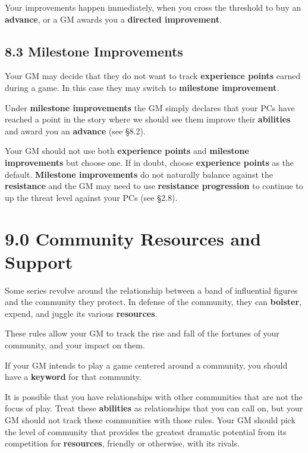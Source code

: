 \documentclass[
  11pt,
]{article}
\begin{document}
Your improvements happen immediately, when you cross the threshold to
buy an \textbf{advance}, or a GM awards you a \textbf{directed
improvement}.

\hypertarget{milestone-improvements}{%
\subsection{8.3 Milestone Improvements}\label{milestone-improvements}}

Your GM may decide that they do not want to track \textbf{experience
points} earned during a game. In this case they may switch to
\textbf{milestone improvement}.

Under \textbf{milestone improvements} the GM simply declares that your
PCs have reached a point in the story where we should see them improve
their \textbf{abilities} and award you an \textbf{advance} (see §8.2).

Your GM should not use both \textbf{experience points} and
\textbf{milestone improvements} but choose one. If in doubt, choose
\textbf{experience points} as the default. \textbf{Milestone
improvements} do not naturally balance against the \textbf{resistance}
and the GM may need to use \textbf{resistance progression} to continue
to up the threat level against your PCs (see §2.8).

\hypertarget{community-resources-and-support}{%
\section{9.0 Community Resources and
Support}\label{community-resources-and-support}}

Some series revolve around the relationship between a band of
influential figures and the community they protect. In defense of the
community, they can \textbf{bolster}, expend, and juggle its various
\textbf{resources}.

These rules allow your GM to track the rise and fall of the fortunes of
your community, and your impact on them.

If your GM intends to play a game centered around a community, you
should have a \textbf{keyword} for that community.

It is possible that you have relationships with other communities that
are not the focus of play. Treat these \textbf{abilities} as
relationships that you can call on, but your GM should not track these
communities with those rules. Your GM should pick the level of community
that provides the greatest dramatic potential from its competition for
\textbf{resources}, friendly or otherwise, with its rivals.
\end{document}
